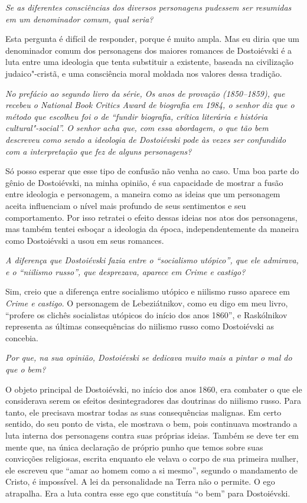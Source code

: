 \medskip

\emph{Se as diferentes consciências dos diversos personagens pudessem ser
resumidas em um denominador comum, qual seria?}

Esta pergunta é difícil de responder, porque é muito ampla. Mas eu diria
que um denominador comum dos personagens dos maiores romances de
Dostoiévski é a luta entre uma ideologia que tenta substituir a
existente, baseada na civilização judaico"-cristã, e uma consciência
moral moldada nos valores dessa tradição.

\medskip

\emph{No prefácio ao segundo livro da série, \emph{Os anos de provação (1850--1859)}, que recebeu o \emph{National Book Critics Award} de biografia em 1984, o
senhor diz que o método que escolheu foi o de ``fundir biografia, crítica
literária e história cultural"-social''. O senhor acha que, com essa
abordagem, o que tão bem descreveu como sendo a ideologia de
Dostoiévski pode às vezes ser confundido com a interpretação que
fez de alguns personagens?}

Só posso esperar que esse tipo de confusão não venha ao caso.
Uma boa parte do gênio de Dostoiévski, na minha opinião, é sua
capacidade de mostrar a fusão entre ideologia e personagem, a maneira
como as ideias que um personagem aceita influenciam o nível mais
profundo de seus sentimentos e seu comportamento. Por isso retratei o
efeito dessas ideias nos atos dos personagens, mas também tentei esboçar
a ideologia da época, independentemente da maneira como Dostoiévski a
usou em seus romances.

\medskip

\emph{A diferença que Dostoiévski fazia entre o ``socialismo utópico'', que
ele admirava, e o ``niilismo russo'', que desprezava, aparece em \emph{Crime e
castigo}?}

Sim, creio que a diferença entre socialismo utópico e niilismo russo
aparece em \emph{Crime e castigo}. O personagem de Lebeziátnikov, como eu
digo em meu livro, ``profere os clichês socialistas utópicos do início
dos anos 1860'', e Raskólnikov representa as últimas consequências do
niilismo russo como Dostoiévski as concebia.

\medskip

\emph{Por que, na sua opinião, Dostoiévski se dedicava muito mais a pintar
o mal do que o bem?}

O objeto principal de Dostoiévski, no início dos anos 1860, era combater
o que ele considerava serem os efeitos desintegradores das doutrinas do
niilismo russo. Para tanto, ele precisava mostrar todas as suas
consequências malignas. Em certo sentido, do seu ponto de vista, ele
mostrava o bem, pois continuava mostrando a luta interna dos personagens
contra suas próprias ideias. Também se deve ter em mente que, na única
declaração de próprio punho que temos sobre suas convicções religiosas,
escrita enquanto ele velava o corpo de sua primeira mulher, ele escreveu
que ``amar ao homem como a si mesmo'', segundo o mandamento de Cristo, é
impossível. A lei da personalidade na Terra não o permite. O
ego atrapalha. Era a luta contra esse ego que constituía ``o bem'' para
Dostoiévski.

